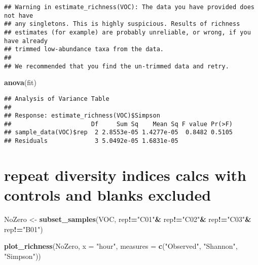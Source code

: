 \documentclass[]{article}
\newenvironment{Shaded}{\begin{snugshade}}{\end{snugshade}}
\newcommand{\KeywordTok}[1]{\textcolor[rgb]{0.13,0.29,0.53}{\textbf{#1}}}
\newcommand{\DataTypeTok}[1]{\textcolor[rgb]{0.13,0.29,0.53}{#1}}
\newcommand{\StringTok}[1]{\textcolor[rgb]{0.31,0.60,0.02}{#1}}
\newcommand{\CommentTok}[1]{\textcolor[rgb]{0.56,0.35,0.01}{\textit{#1}}}
\newcommand{\OperatorTok}[1]{\textcolor[rgb]{0.81,0.36,0.00}{\textbf{#1}}}
\newcommand{\NormalTok}[1]{#1}
\begin{document}
\begin{verbatim}
## Warning in estimate_richness(VOC): The data you have provided does not have
## any singletons. This is highly suspicious. Results of richness
## estimates (for example) are probably unreliable, or wrong, if you have already
## trimmed low-abundance taxa from the data.
## 
## We recommended that you find the un-trimmed data and retry.
\end{verbatim}

\begin{Shaded}
\begin{Highlighting}[]
\KeywordTok{anova}\NormalTok{(fit)}
\end{Highlighting}
\end{Shaded}

\begin{verbatim}
## Analysis of Variance Table
## 
## Response: estimate_richness(VOC)$Simpson
##                      Df     Sum Sq    Mean Sq F value Pr(>F)
## sample_data(VOC)$rep  2 2.8553e-05 1.4277e-05  0.8482 0.5105
## Residuals             3 5.0492e-05 1.6831e-05
\end{verbatim}

\begin{Shaded}
\end{Shaded}

\section{repeat diversity indices calcs with controls and blanks
excluded}\label{repeat-diversity-indices-calcs-with-controls-and-blanks-excluded}

\begin{Shaded}
\begin{Highlighting}[]
\NormalTok{NoZero <-}\StringTok{ }\KeywordTok{subset_samples}\NormalTok{(VOC, rep}\OperatorTok{!=}\StringTok{"C01"}\OperatorTok{&}\StringTok{ }\NormalTok{rep}\OperatorTok{!=}\StringTok{"C02"}\OperatorTok{&}\StringTok{ }\NormalTok{rep}\OperatorTok{!=}\StringTok{"C03"}\OperatorTok{&}\StringTok{ }\NormalTok{rep}\OperatorTok{!=}\StringTok{"B01"}\NormalTok{)}

\KeywordTok{plot_richness}\NormalTok{(NoZero, }\DataTypeTok{x =} \StringTok{"hour"}\NormalTok{, }\DataTypeTok{measures =} \KeywordTok{c}\NormalTok{(}\StringTok{"Observed"}\NormalTok{, }\StringTok{"Shannon"}\NormalTok{, }\StringTok{"Simpson"}\NormalTok{))}
\end{Highlighting}
\end{Shaded}
\end{document}
